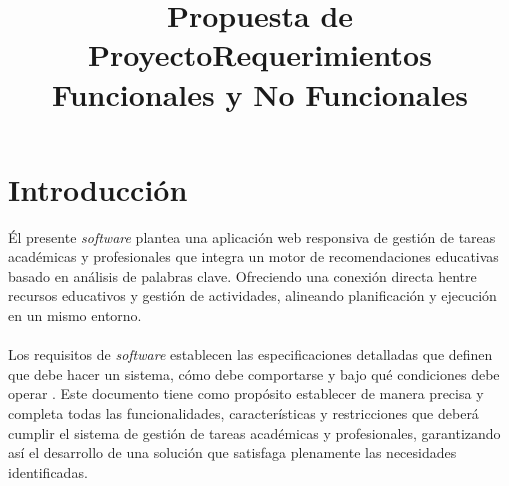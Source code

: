 \documentclass[11pt]{article}
\title{Propuesta de Proyecto}
\title{Requerimientos Funcionales y No Funcionales}
\begin{document}

                                                     



\section{Introducción}
Él presente \textit{software} plantea una aplicación web responsiva de gestión de tareas académicas y profesionales que integra
 un motor de recomendaciones educativas basado en análisis de palabras clave. Ofreciendo una conexión directa hentre recursos educativos y 
 gestión de actividades, alineando planificación y ejecución en un mismo entorno.\\\\
 Los requisitos de \textit{software} establecen las especificaciones detalladas que definen que debe hacer un sistema, cómo debe 
 comportarse y bajo qué condiciones debe operar \autocite{Requirements2024}. Este documento  tiene como propósito establecer de
 manera precisa y completa todas las funcionalidades, características y restricciones que deberá cumplir el sistema de gestión de
 tareas académicas y profesionales, garantizando así el desarrollo de una solución que satisfaga plenamente las necesidades identificadas. 
\end{document}
